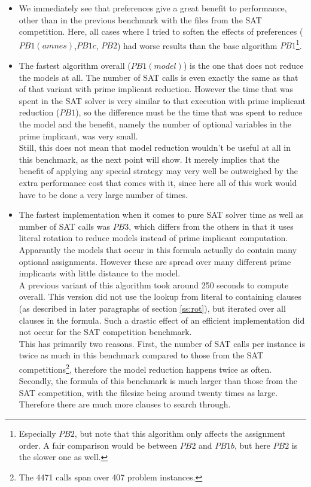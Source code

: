 \begin{itemize}
\item We immediately see that preferences give a great benefit to performance, other than in the previous benchmark with the files from the SAT competition. Here, all cases where I tried to soften the effects of preferences ($PB1(amnes)$,$PB1c$, $PB2$) had worse results than the base algorithm $PB1$\footnote{
	Especially $PB2$, but note that this algorithm only affects the assignment order. A fair comparison would be between $PB2$ and $PB1b$, but here $PB2$ is the slower one as well.
}. 
\item The fastest algorithm overall ($PB1(model)$) is the one that does not reduce the models at all. The number of SAT calls is even exactly the same as that of that variant with prime implicant reduction. However the time that was spent in the SAT solver is very similar to that execution with prime implicant reduction ($PB1$), so the difference must be the time that was spent to reduce the model and the benefit, namely the number of optional variables in the prime implicant, was very small.\\
Still, this does not mean that model reduction wouldn't be useful at all in this benchmark, as the next point will show. It merely implies that the benefit of applying any special strategy may very well be outweighed by the extra performance cost that comes with it, since here all of this work would have to be done a very large number of times.
\item The fastest implementation when it comes to pure SAT solver time as well as number of SAT calls was $PB3$, which differs from the others in that it uses literal rotation to reduce models instead of prime implicant computation. Apparantly the models that occur in this formula actually do contain many optional assignments. However these are spread over many different prime implicants with little distance to the model.\\
A previous variant of this algorithm took around 250 seconds to compute overall. This version did not use the lookup from literal to containing clauses (as described in later paragraphs of section \ref{ss:rot}), but iterated over all clauses in the formula. Such a drastic effect of an efficient implementation did not occur for the SAT competition benchmark.\\
This has primarily two reasons. First, the number of SAT calls per instance is twice as much in this benchmark compared to those from the SAT competitions\footnote{The 4471 calls span over 407 problem instances.}, therefore the model reduction happens twice as often. Secondly, the formula of this benchmark is much larger than those from the SAT competition, with the filesize being around twenty times as large. Therefore there are much more clauses to search through.

\end{itemize}
